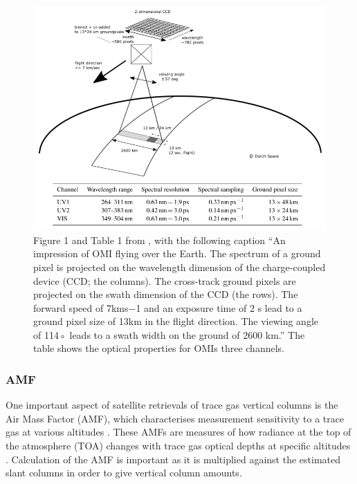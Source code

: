     \begin{figure}
      \includegraphics[width=\textwidth]{Figures/Shenkeveld_OMI_summary.png}
      \caption{ %
        Figure 1 and Table 1 from \cite{Schenkeveld2017}, with the following caption ``An impression of OMI flying over the Earth. The spectrum of a ground pixel is projected on the wavelength dimension of the charge-coupled device (CCD; the columns). The cross-track ground pixels are projected on the swath dimension of the CCD (the rows). The forward speed of 7kms−1 and an exposure time of 2 s lead to a ground pixel size of 13km in the flight direction. The viewing angle of 114◦ leads to a swath width on the ground of 2600 km.''
        The table shows the optical properties for OMIs three channels.}
      \label{LR:fig:Shenkeveld_OMI_summary}
    \end{figure}
    
    \subsubsection{AMF}
      One important aspect of satellite retrievals of trace gas vertical columns is the Air Mass Factor (AMF), which characterises measurement sensitivity to a trace gas at various altitudes \cite[e.g.]{Palmer2001}.
      These AMFs are measures of how radiance at the top of the atmosphere (TOA) changes with trace gas optical depths at specific altitudes \citep{Lorente2017}.
      Calculation of the AMF is important as it is multiplied against the estimated slant columns in order to give vertical column amounts.
      
